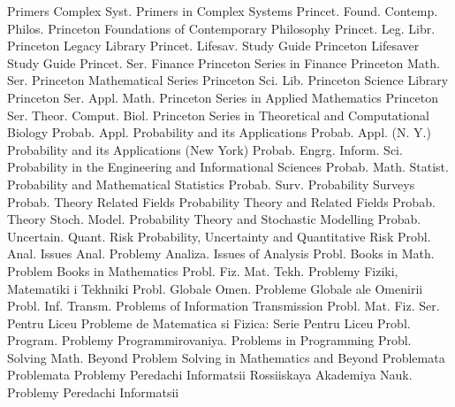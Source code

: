 {Primers Complex Syst.}
{Primers in Complex Systems}
{Princet. Found. Contemp. Philos.}
{Princeton Foundations of Contemporary Philosophy}
{Princet. Leg. Libr.}
{Princeton Legacy Library}
{Princet. Lifesav. Study Guide}
{Princeton Lifesaver Study Guide}
{Princet. Ser. Finance}
{Princeton Series in Finance}
{Princeton Math. Ser.}
{Princeton Mathematical Series}
{Princeton Sci. Lib.}
{Princeton Science Library}
{Princeton Ser. Appl. Math.}
{Princeton Series in Applied Mathematics}
{Princeton Ser. Theor. Comput. Biol.}
{Princeton Series in Theoretical and Computational Biology}
{Probab. Appl.}
{Probability and its Applications}
{Probab. Appl. (N. Y.)}
{Probability and its Applications (New York)}
{Probab. Engrg. Inform. Sci.}
{Probability in the Engineering and Informational Sciences}
{Probab. Math. Statist.}
{Probability and Mathematical Statistics}
{Probab. Surv.}
{Probability Surveys}
{Probab. Theory Related Fields}
{Probability Theory and Related Fields}
{Probab. Theory Stoch. Model.}
{Probability Theory and Stochastic Modelling}
{Probab. Uncertain. Quant. Risk}
{Probability, Uncertainty and Quantitative Risk}
{Probl. Anal. Issues Anal.}
{Problemy Analiza. Issues of Analysis}
{Probl. Books in Math.}
{Problem Books in Mathematics}
{Probl. Fiz. Mat. Tekh.}
{Problemy Fiziki, Matematiki i Tekhniki}
{Probl. Globale Omen.}
{Probleme Globale ale Omenirii}
{Probl. Inf. Transm.}
{Problems of Information Transmission}
{Probl. Mat. Fiz. Ser. Pentru Liceu}
{Probleme de Matematica si Fizica: Serie Pentru Liceu}
{Probl. Program.}
{Problemy Programmirovaniya. Problems in Programming}
{Probl. Solving Math. Beyond}
{Problem Solving in Mathematics and Beyond}
{Problemata}
{Problemata}
{Problemy Peredachi Informatsii}
{Rossiiskaya Akademiya Nauk. Problemy Peredachi Informatsii}
